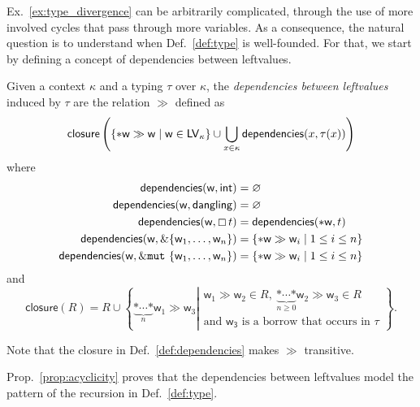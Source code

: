 \noindent
Ex.~\ref{ex:type_divergence} can be arbitrarily complicated, through the
use of more involved cycles that pass through more variables. As a consequence,
the natural question is to understand when Def.~\ref{def:type} is well-founded.
For that, we start by defining a concept of dependencies between leftvalues.

\begin{definition}\label{def:dependencies}
  Given a context $\kappa$ and a typing $\tau$ over $\kappa$, the \emph{dependencies between leftvalues}
  induced by $\tau$ are the relation $\gg$ defined as
  \[
  \mathsf{closure}\left(\{\mathtt{*}\mathsf{w}\gg\mathsf{w}\mid\mathsf{w}\in\mathsf{LV}_\kappa\}
  \cup\bigcup\limits_{x\in\kappa}\mathsf{dependencies}(x,\tau(x))\right)
  \]
  where
  \begin{align*}
    \mathsf{dependencies}(\mathsf{w},\mathsf{int})&=\varnothing\\
    \mathsf{dependencies}(\mathsf{w},\mathsf{dangling})&=\varnothing\\
    \mathsf{dependencies}(\mathsf{w},\boxempty\,{t})&=\mathsf{dependencies}(\mathtt{*}\mathsf{w},t)\\
    \mathsf{dependencies}(\mathsf{w},\&\{\mathsf{w}_1,\ldots,\mathsf{w}_n\})&=\{\mathtt{*}\mathsf{w}\gg\mathsf{w}_i\mid 1\le i\le n\}\\
    \mathsf{dependencies}(\mathsf{w},\&\mathtt{mut}\ \{\mathsf{w}_1,\ldots,\mathsf{w}_n\})&=\{\mathtt{*}\mathsf{w}\gg\mathsf{w}_i\mid 1\le i\le n\}
  \end{align*}
  and
  \[
  \mathsf{closure}(R)=R\cup\left\{\underbrace{\mathtt{*}\cdots\mathtt{*}}_{n}\mathsf{w}_1\gg\mathsf{w}_3\left|
  \begin{array}{l}
    \mathsf{w}_1\gg\mathsf{w}_2\in R,\ \underbrace{\mathtt{*}\cdots\mathtt{*}}_{n\ge 0}\mathsf{w}_2\gg\mathsf{w}_3\in R\\
    \text{and $\mathsf{w_3}$ is a borrow that occurs in $\tau$}
  \end{array}\right.\right\}.
  \]
\end{definition}

\noindent
Note that the closure in Def.~\ref{def:dependencies} makes $\gg$ transitive.

Prop.~\ref{prop:acyclicity} proves that the dependencies between leftvalues
model the pattern of the recursion in Def.~\ref{def:type}.

